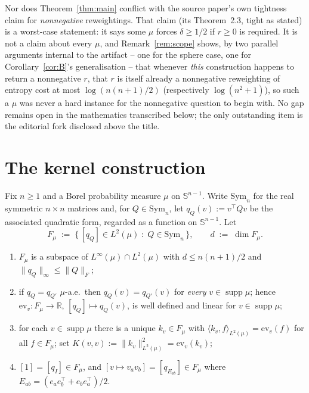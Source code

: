 \documentclass{aicr-solution}
\newcommand{\Sph}{\mathbb{S}^{n-1}}
\newcommand{\Reals}{\mathbb{R}}
\newcommand{\Sym}[1]{\mathrm{Sym}_{#1}}
\newcommand{\supp}{\operatorname{supp}}
\newcommand{\ev}{\mathrm{ev}}
\begin{document}
Nor does Theorem~\ref{thm:main} conflict with the source paper's own
tightness claim for \emph{nonnegative} reweightings. That claim (its
Theorem~2.3, tight as stated) is a worst-case statement: it says some
$\mu$ forces $\delta \ge 1/2$ if $r \ge 0$ is required. It is not a
claim about every $\mu$, and Remark~\ref{rem:scope} shows, by two
parallel arguments internal to the artifact -- one for the sphere
case, one for Corollary~\ref{cor:B}'s generalisation -- that whenever
\emph{this} construction happens to return a nonnegative $r$, that $r$
is itself already a nonnegative reweighting of entropy cost at most
$\log(n(n+1)/2)$ (respectively $\log(n^{2}+1)$), so such a $\mu$ was
never a hard instance for the nonnegative question to begin with. No
gap remains open in the mathematics transcribed below; the only
outstanding item is the editorial fork disclosed above the title.

\section{The kernel construction}\label{sec:kernel}

Fix $n \ge 1$ and a Borel probability measure $\mu$ on $\Sph$. Write
$\Sym{n}$ for the real symmetric $n \times n$ matrices and, for $Q \in
\Sym{n}$, let $q_{Q}(v) := v^{\top} Q v$ be the associated quadratic
form, regarded as a function on $\Sph$. Let
\[
  F_{\mu} \;:=\; \big\{\, [q_{Q}] \in L^{2}(\mu) \;:\; Q \in \Sym{n}
    \,\big\}, \qquad d \;:=\; \dim F_{\mu} .
\]

\begin{lemma}\label{lem:kernel-space}
\begin{enumerate}
\item[(a)] $F_{\mu}$ is a subspace of $L^{\infty}(\mu) \cap L^{2}(\mu)$
  with $d \le n(n+1)/2$ and $\|q_{Q}\|_{\infty} \le \|Q\|_{F}$;
\item[(b)] if $q_{Q} = q_{Q'}$ $\mu$-a.e.\ then $q_{Q}(v) = q_{Q'}(v)$
  for \emph{every} $v \in \supp\mu$; hence $\ev_{v} : F_{\mu} \to
  \Reals$, $[q_{Q}] \mapsto q_{Q}(v)$, is well defined and linear for
  $v \in \supp\mu$;
\item[(c)] for each $v \in \supp\mu$ there is a unique $k_{v} \in
  F_{\mu}$ with $\langle k_{v}, f\rangle_{L^{2}(\mu)} = \ev_{v}(f)$
  for all $f \in F_{\mu}$; set $K(v,v) := \|k_{v}\|^{2}_{L^{2}(\mu)} =
  \ev_{v}(k_{v})$;
\item[(d)] $[1] = [q_{I}] \in F_{\mu}$, and $[v \mapsto v_{a}v_{b}] =
  [q_{E_{ab}}] \in F_{\mu}$ where $E_{ab} = (e_{a}e_{b}^{\top} +
  e_{b}e_{a}^{\top})/2$.
\end{enumerate}
\end{lemma}
\end{document}
